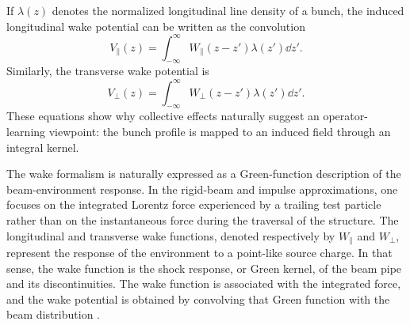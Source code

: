 If $\lambda(z)$ denotes the normalized longitudinal line density of a bunch, the induced longitudinal wake potential can be written as the convolution
\begin{equation}
    V_{\parallel}(z)=\int_{-\infty}^{\infty} W_{\parallel}(z-z')\lambda(z')\dd z'.
    \label{eq:long_wake_potential_revised}
\end{equation}
Similarly, the transverse wake potential is
\begin{equation}
    V_{\perp}(z)=\int_{-\infty}^{\infty} W_{\perp}(z-z')\lambda(z')\dd z'.
    \label{eq:trans_wake_potential_revised}
\end{equation}
These equations show why collective effects naturally suggest an operator-learning viewpoint: the bunch profile is mapped to an induced field through an integral kernel.

The wake formalism is naturally expressed as a Green-function description of the beam-environment response. In the rigid-beam and impulse approximations, one focuses on the integrated Lorentz force experienced by a trailing test particle rather than on the instantaneous force during the traversal of the structure. The longitudinal and transverse wake functions, denoted respectively by $W_{\parallel}$ and $ W_{\perp}$, represent the response of the environment to a point-like source charge. In that sense, the wake function is the shock response, or Green kernel, of the beam pipe and its discontinuities. The wake function is associated with the integrated force, and the wake potential is obtained by convolving that Green function with the beam distribution \cite{metral_wake_2021}.

